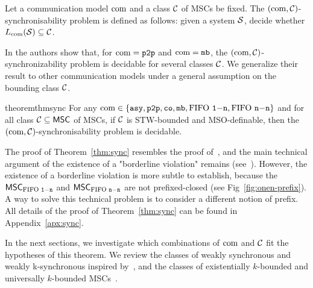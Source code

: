 \begin{definition}
Let a communication model $\textup{com}$ and a class $\mathcal{C}$ of MSCs be fixed. The
$(\textup{com},\mathcal{C})$-synchronisability problem is defined as follows: given a
system $\mathcal{S}$, decide whether $L_{\textup{com}}(\mathcal{S})\subseteq \mathcal{C}$.
\end{definition}

In \cite{BolligGFLLS21} the authors show that, for $\textup{com} = \mathtt{p2p}$ and $\textup{com} = \mathtt{mb}$, 
the $(\textup{com},\mathcal{C})$-synchronizability problem is decidable for several classes $\mathcal{C}$. 
We generalize their result to other communication models under a general assumption on the bounding class $\mathcal{C}$.

\begin{restatable}{theorem}{thmsync}\label{thm:sync}
	For any $\textup{com} \in \{\mathtt{asy}, \mathtt{p2p}, \mathtt{co}, \mathtt{mb}, \text{FIFO } \mathtt{1\mathsf{-}n}, \text{FIFO } \mathtt{n\mathsf{-}n}\}$ and
	for all class $\mathcal{C} \subseteq \mathsf{MSC}$ of MSCs,
	if $\mathcal{C}$ is STW-bounded and MSO-definable,
	then the $(\textup{com},\mathcal{C})$-synchronisability problem is decidable.
\end{restatable}
The proof of Theorem~\ref{thm:sync} resembles the proof of~\cite[Theorem~11]{BolligGFLLS21-long}, and the main technical argument of the existence of a "borderline violation" remains 
(see~\cite[Lemma~9]{BolligGFLLS21-long}). However, the existence of a borderline violation is more subtle to establish, because the $\mathsf{MSC}_{\text{FIFO } \mathtt{1\mathsf{-}n}}$ and 
$\mathsf{MSC}_{\text{FIFO } \mathtt{n\mathsf{-}n}}$ are not prefixed-closed (see Fig~\ref{fig:onen-prefix}).
A way to solve this technical problem is to consider a different notion of prefix. All details of
the proof of Theorem~\ref{thm:sync} can be found in Appendix~\ref{apx:sync}.


In the next sections, we investigate which combinations of $\textup{com}$ and $\mathcal{C}$ fit the hypotheses of this theorem.
We review the classes of weakly synchronous and weakly k-synchronous inspired
by~\cite{DBLP:conf/cav/BouajjaniEJQ18},
and the classes of existentially $k$-bounded and universally $k$-bounded MSCs~\cite{DBLP:conf/dlt/GenestMK04}.


